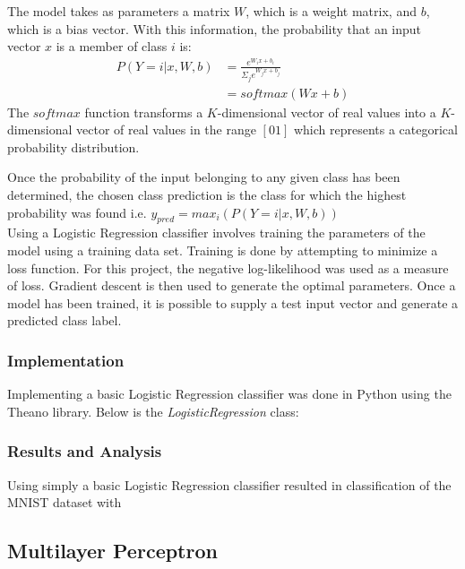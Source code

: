 \documentclass{article}
\begin{document}
  The model takes as parameters a matrix $W$, which is a weight matrix, and $b$, which is a bias vector. With this information, the probability that an input vector 
  $x$ is a member of class $i$ is: \\
  \begin{align*}
  P(Y=i|x,W,b) &= \frac{e^{W_{i}x + b_{i}}}{\Sigma_{j}e^{W_{j}x + b_{j}}} \\
               &= softmax(Wx+b)
  \end{align*}
  The $softmax$ function transforms a $K$-dimensional vector of real values into a $K$-dimensional vector of real values in the range $[0 1]$ which represents a
  categorical probability distribution.
  
  Once the probability of the input belonging to any given class has been determined, the chosen class prediction is the class for which the highest probability
  was found i.e. $y_{pred} = max_{i}(P(Y=i|x,W,b))$ \\
  
  Using a Logistic Regression classifier involves training the parameters of the model using a training data set. Training is done by attempting to minimize a loss
  function. For this project, the negative log-likelihood was used as a measure of loss. Gradient descent is then used to generate the optimal parameters. Once a 
  model has been trained, it is possible to supply a test input vector and generate a predicted class label.
  
  \subsubsection{Implementation}
  
  Implementing a basic Logistic Regression classifier was done in Python using the Theano library. Below is the 
  \textit{LogisticRegression} class:
  

  \subsubsection{Results and Analysis}
  
  Using simply a basic Logistic Regression classifier resulted in classification of the MNIST dataset with  

\subsection{Multilayer Perceptron}
\end{document}
